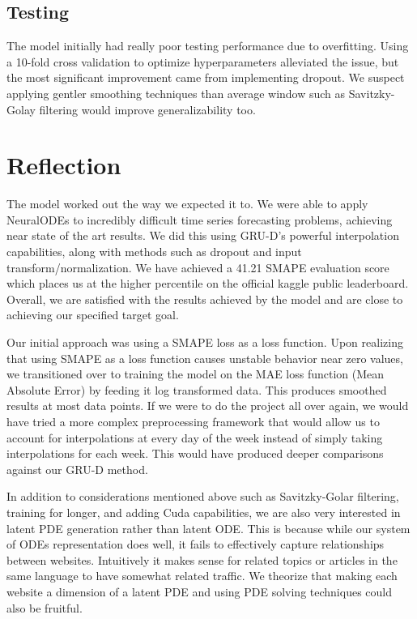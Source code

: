 \documentclass{article} %
\begin{document}
\subsection{Testing}
The model initially had really poor testing performance due to overfitting. Using a 10-fold cross validation to optimize hyperparameters alleviated the issue, but the most significant improvement came from implementing dropout. We suspect applying gentler smoothing techniques than average window such as Savitzky-Golay filtering would improve generalizability too. 

\section{Reflection}
The model worked out the way we expected it to. We were able to apply NeuralODEs to incredibly difficult time series forecasting problems, achieving near state of the art results. We did this using GRU-D’s powerful interpolation capabilities, along with methods such as dropout and input transform/normalization. We have achieved a 41.21 SMAPE evaluation score which places us at the higher percentile on the official kaggle public leaderboard. Overall, we are satisfied with the results achieved by the model and are close to achieving our specified target goal.

Our initial approach was using a SMAPE loss as a loss function. Upon realizing that using SMAPE as a loss function causes unstable behavior near zero values, we transitioned over to training the model on the MAE loss function (Mean Absolute Error) by feeding it log transformed data. This produces smoothed results at most data points. If we were to do the project all over again, we would have tried a more complex preprocessing framework that would allow us to account for interpolations at every day of the week instead of simply taking interpolations for each week. This would have produced deeper comparisons against our GRU-D method.

In addition to considerations mentioned above such as Savitzky-Golar filtering, training for longer, and adding Cuda capabilities, we are also very interested in latent PDE generation rather than latent ODE. This is because while our system of ODEs representation does well, it fails to effectively capture relationships between websites. Intuitively it makes sense for related topics or articles in the same language to have somewhat related traffic. We theorize that making each website a dimension of a latent PDE and using PDE solving techniques could also be fruitful. 
\end{document}
